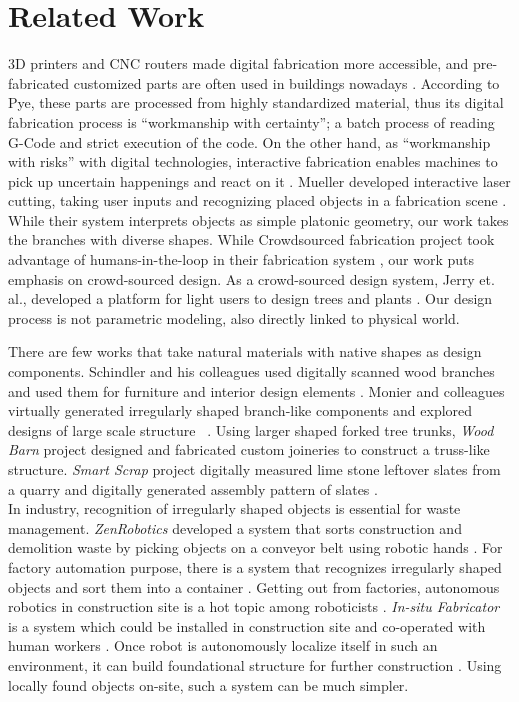 \section{Related Work}
3D printers and CNC routers made digital fabrication more accessible, and pre-fabricated customized parts are often used in buildings nowadays \cite{knaack2012prefabricated}.
According to Pye, these parts are processed from highly standardized material, thus its digital fabrication process is ``workmanship with certainty''; a batch process of reading G-Code and strict execution of the code.
On the other hand, as ``workmanship with risks'' with digital technologies, interactive fabrication enables machines to pick up uncertain happenings and react on it \cite{willis2011interactive}.
Mueller developed interactive laser cutting, taking user inputs and recognizing placed objects in a fabrication scene \cite{Mueller:2012:ICI:2380116.2380191}.
While their system interprets objects as simple platonic geometry, our work takes the branches with diverse shapes.
While Crowdsourced fabrication project took advantage of humans-in-the-loop in their fabrication system \cite{lafreniere2016crowdsourced}, our work puts emphasis on crowd-sourced design.
As a crowd-sourced design system, Jerry et. al., developed a platform for light users to design trees and plants \cite{talton2009exploratory}.
Our design process is not parametric modeling, also directly linked to physical world. 

There are few works that take natural materials with native shapes as design components.
Schindler and his colleagues used digitally scanned wood branches and used them for furniture and interior design elements \cite{schindler2014processing}.
Monier and colleagues virtually generated irregularly shaped branch-like components and explored designs of large scale structure ~\cite{monier2013use}.
Using larger shaped forked tree trunks, \textit{Wood Barn} project designed and fabricated custom joineries to construct a truss-like structure\cite{woodbarn}.
\textit{Smart Scrap} project digitally measured lime stone leftover slates from a quarry and digitally generated assembly pattern of slates \cite{smartscrap}.\\

In industry, recognition of irregularly shaped objects is essential for waste management.
\textit{ZenRobotics} developed a system that sorts construction and demolition waste by picking objects on a conveyor belt using robotic hands \cite{lukka2014zenrobotics}.
For factory automation purpose, there is a system that recognizes irregularly shaped objects and sort them into a container \cite{sujan2000design}.
Getting out from factories, autonomous robotics in construction site is a hot topic among roboticists \cite{feng2014towards}.
\textit{In-situ Fabricator} is a system which could be installed in construction site and co-operated with human workers \cite{dorfler2016mobile}.
Once robot is autonomously localize itself in such an environment, it can build foundational structure for further construction \cite{napp2014distributed}.
Using locally found objects on-site, such a system can be much simpler.\\

